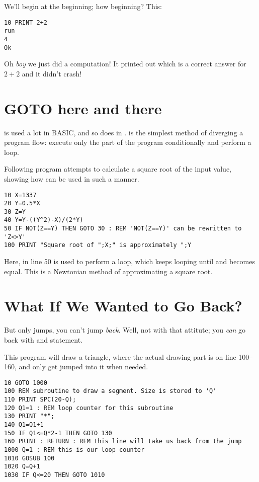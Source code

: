 \quad
{}

We'll begin at the beginning; how beginning? This:

\begin{lstlisting}
10 PRINT 2+2
run
4
Ok
\end{lstlisting}

Oh \emph{boy} we just did a computation! It printed out  which is a correct answer for $2+2$ and it didn't crash!

\section[GOTO]{GOTO here and there}

 is used a lot in BASIC, and so does in \tbas.  is the simplest method of diverging a program flow: execute only the part of the program conditionally and perform a loop.

Following program attempts to calculate a square root of the input value,  showing how  can be used in such a manner.

\begin{lstlisting}
10 X=1337
20 Y=0.5*X
30 Z=Y
40 Y=Y-((Y^2)-X)/(2*Y)
50 IF NOT(Z==Y) THEN GOTO 30 : REM 'NOT(Z==Y)' can be rewritten to 'Z<>Y' 
100 PRINT "Square root of ";X;" is approximately ";Y
\end{lstlisting}

Here,  in line 50 is used to perform a loop, which keeps looping until  and  becomes equal. This is a Newtonian method of approximating a square root. 

\section[Subroutine with GOSUB]{What If We Wanted to Go Back?}

But  only jumps, you can't jump \emph{back}. Well, not with that attitute; you \emph{can} go back with  and  statement.

This program will draw a triangle, where the actual drawing part is on line 100--160, and only get jumped into it when needed.

\begin{lstlisting}
10 GOTO 1000
100 REM subroutine to draw a segment. Size is stored to 'Q'
110 PRINT SPC(20-Q);
120 Q1=1 : REM loop counter for this subroutine
130 PRINT "*";
140 Q1=Q1+1
150 IF Q1<=Q*2-1 THEN GOTO 130
160 PRINT : RETURN : REM this line will take us back from the jump
1000 Q=1 : REM this is our loop counter
1010 GOSUB 100
1020 Q=Q+1
1030 IF Q<=20 THEN GOTO 1010
\end{lstlisting}

